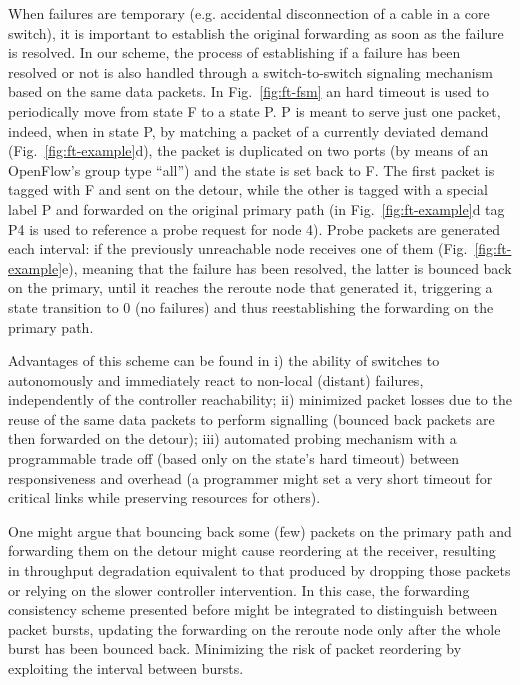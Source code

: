 \documentclass[10pt,conference]{IEEEtran}
\begin{document}
When failures are temporary (e.g. accidental disconnection of a cable in a core switch), it is important to establish the original forwarding as soon as the failure is resolved. In our scheme, the process of establishing if a failure has been resolved or not is also handled through a switch-to-switch signaling mechanism based on the same data packets. In Fig.~\ref{fig:ft-fsm} an hard timeout  is used to periodically move from state F to a state P. P is meant to serve just one packet, indeed, when in state P, by matching a packet of a currently deviated demand (Fig.~\ref{fig:ft-example}d), the packet is duplicated on two ports (by means of an OpenFlow's group type ``all'') and the state is set back to F. The first packet is tagged with F and sent on the detour, while the other is tagged with a special label P and forwarded on the original primary path (in Fig.~\ref{fig:ft-example}d tag P4 is used to reference a probe request for node 4). Probe packets are generated each  interval: if the previously unreachable node receives one of them (Fig.~\ref{fig:ft-example}e), meaning that the failure has been resolved, the latter is bounced back on the primary, until it reaches the reroute node that generated it, triggering a state transition to 0 (no failures) and thus reestablishing the forwarding on the primary path.

Advantages of this scheme can be found in i) the ability of switches to autonomously and immediately react to non-local (distant) failures, independently of the controller reachability; ii) minimized packet losses due to the reuse of the same data packets to perform signalling (bounced back packets are then forwarded on the detour); iii) automated probing mechanism with a programmable trade off (based only on the  state's hard timeout) between responsiveness and overhead (a programmer might set a very short timeout for critical links while preserving resources for others).

One might argue that bouncing back some (few) packets on the primary path and forwarding them on the detour might cause reordering at the receiver, resulting in throughput degradation equivalent to that produced by dropping those packets or relying on the slower controller intervention. In this case, the forwarding consistency scheme presented before might be integrated to distinguish between packet bursts, updating the forwarding on the reroute node only after the whole burst has been bounced back. Minimizing the risk of packet reordering by exploiting the interval between bursts.
\end{document}
